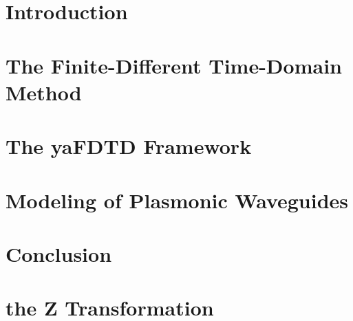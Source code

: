 \documentclass[openany]{book}
\begin{document}
\fontsize{12}{1.8em}\selectfont


\frontmatter




\tableofcontents





\mainmatter

\chapter{Introduction}




\chapter{The Finite-Different Time-Domain Method}








\chapter{The yaFDTD Framework}


\chapter{Modeling of Plasmonic Waveguides}


\chapter{Conclusion}



\appendix

\chapter{the Z Transformation}

\backmatter


\end{document}

